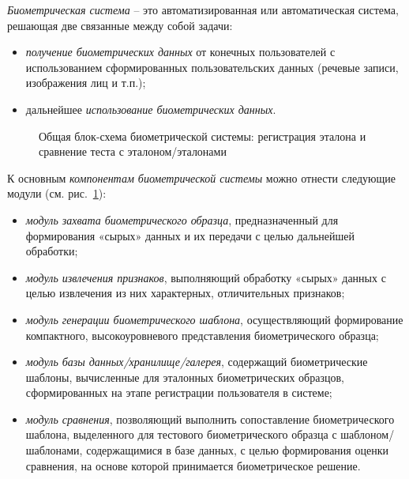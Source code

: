 \documentclass[12pt]{book}
\begin{document}
\large{\textit{Биометрическая система} -- это автоматизированная или автоматическая система, решающая две связанные между собой задачи: 

\begin{itemize}[topsep=1pt] \itemsep0.1em
\item \textit{получение биометрических данных} от конечных пользователей с использованием сформированных пользовательских данных (речевые записи, изображения лиц и т.п.);
\item дальнейшее \textit{использование биометрических данных}.
\end{itemize}

\begin{figure}[h]
\caption{Общая блок-схема биометрической системы: регистрация эталона и сравнение теста с эталоном/эталонами}
\label{fig:figure_1_1}
\end{figure}

К основным \textit{компонентам биометрической системы} можно отнести следующие модули (см. рис.~\ref{fig:figure_1_1}): 

\begin{itemize}[topsep=1pt] \itemsep0.1em
\item \textit{модуль захвата биометрического образца}, предназначенный для формирования «сырых» данных и их передачи с целью дальнейшей обработки;
\item \textit{модуль извлечения признаков}, выполняющий обработку «сырых» данных с целью извлечения из них характерных, отличительных признаков;
\item \textit{модуль генерации биометрического шаблона}, осуществляющий формирование компактного, высокоуровневого представления биометрического образца;
\item \textit{модуль базы данных/хранилище/галерея}, содержащий биометрические шаблоны, вычисленные для эталонных биометрических образцов, сформированных на этапе регистрации пользователя в системе;
\item \textit{модуль сравнения}, позволяющий выполнить сопоставление биометрического шаблона, выделенного для тестового биометрического образца с шаблоном/шаблонами, содержащимися в базе данных, с целью формирования оценки сравнения, на основе которой принимается биометрическое решение.
\end{itemize}

}
\end{document}
